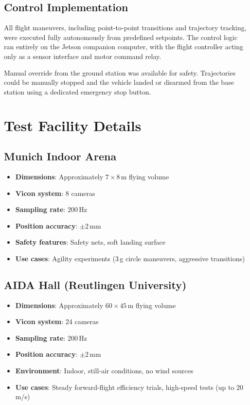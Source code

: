 \subsection{Control Implementation}

All flight maneuvers, including point-to-point transitions and trajectory tracking, were executed fully autonomously from predefined setpoints. The control logic ran entirely on the Jetson companion computer, with the flight controller acting only as a sensor interface and motor command relay.

Manual override from the ground station was available for safety. Trajectories could be manually stopped and the vehicle landed or disarmed from the base station using a dedicated emergency stop button.

\section{Test Facility Details}\label{sec:facilities-detailed}

\subsection{Munich Indoor Arena}

\begin{itemize}
\item \textbf{Dimensions}: Approximately $7 \times 8$\,m flying volume
\item \textbf{Vicon system}: 8 cameras
\item \textbf{Sampling rate}: 200\,Hz
\item \textbf{Position accuracy}: $\pm 2$\,mm
\item \textbf{Safety features}: Safety nets, soft landing surface
\item \textbf{Use cases}: Agility experiments (3\,g circle maneuvers, aggressive transitions)
\end{itemize}

\subsection{AIDA Hall (Reutlingen University)}

\begin{itemize}
\item \textbf{Dimensions}: Approximately $60 \times 45$\,m flying volume
\item \textbf{Vicon system}: 24 cameras
\item \textbf{Sampling rate}: 200\,Hz
\item \textbf{Position accuracy}: $\pm 2$\,mm
\item \textbf{Environment}: Indoor, still-air conditions, no wind sources
\item \textbf{Use cases}: Steady forward-flight efficiency trials, high-speed tests (up to 20\,m/s)
\end{itemize}

